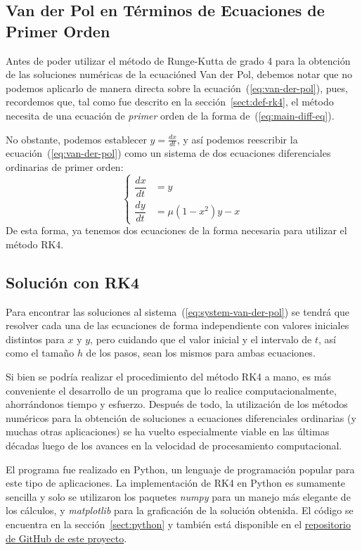 \documentclass[12pt, a4paper]{article}
\begin{document}
\subsection{Van der Pol en Términos de Ecuaciones de Primer Orden}

Antes de poder utilizar el método de Runge-Kutta de grado 4 para la obtención de las soluciones numéricas de la ecuacióned Van der Pol, debemos notar que no podemos aplicarlo de manera directa sobre la ecuación~(\ref{eq:van-der-pol}), pues, recordemos que, tal como fue descrito en la sección~\ref{sect:def-rk4}, el método necesita de una ecuación de \textit{primer} orden de la forma de~(\ref{eq:main-diff-eq}).

No obstante, podemos establecer \(y = \frac{dx}{dt}\), y así podemos reescribir la ecuación~(\ref{eq:van-der-pol}) como un sistema de dos ecuaciones diferenciales ordinarias de primer orden:
\begin{equation} \label{eq:system-van-der-pol}
	\begin{cases}
		\dfrac{dx}{dt} &= y \\[1em]
		\dfrac{dy}{dt} &= \mu(1 - x^{2})y - x
	\end{cases}
\end{equation}
De esta forma, ya tenemos dos ecuaciones de la forma necesaria para utilizar el método RK4.

\subsection{Solución con RK4}

Para encontrar las soluciones al sistema~(\ref{eq:system-van-der-pol}) se tendrá que resolver cada una de las ecuaciones de forma independiente con valores iniciales distintos para \(x\) y \(y\), pero cuidando que el valor inicial y el intervalo de \(t\), así como el tamaño \(h\) de los pasos, sean los mismos para ambas ecuaciones.

Si bien se podría realizar el procedimiento del método RK4 a mano, es más conveniente el desarrollo de un programa que lo realice computacionalmente, ahorrándonos tiempo y esfuerzo. Después de todo, la utilización de los métodos numéricos para la obtención de soluciones a ecuaciones diferenciales ordinarias (y muchas otras aplicaciones) se ha vuelto especialmente viable en las últimas décadas luego de los avances en la velocidad de procesamiento computacional.

El programa fue realizado en Python, un lenguaje de programación popular para este tipo de aplicaciones. La implementación de RK4 en Python es sumamente sencilla y solo se utilizaron los paquetes \textit{numpy} para un manejo más elegante de los cálculos, y \textit{matplotlib} para la graficación de la solución obtenida. El código se encuentra en la sección~\ref{sect:python} y también está disponible en el \href{https://github.com/camargomau/runge-kutta}{repositorio de GitHub de este proyecto}.
\end{document}
